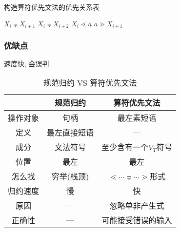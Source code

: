             \begin{algorithm}
                \caption{构造算符优先文法的优先关系表}
                \label{algorithm-make-priority-table}
                \begin{algorithmic}[1]
                                    \State $X_i\eqdot X_{i+1}$
                                    \State $X_i\eqdot X_{i+2}$
                                        \State $X_i\lessdot a$
                                    \EndFor
                                        \State $a\gtrdot X_{i+1}$
                                    \EndFor
                                \EndIf
                            \EndFor
                        \EndFor
                    \EndProcedure
                \end{algorithmic}
            \end{algorithm}

            \subsubsection{优缺点}

                速度快, 会误判

                \begin{table}[h!]
                    \centering
                    \caption{规范归约 VS 算符优先文法}
                    \label{tab:gfgyvcsfyx}
                    \begin{tabular}{ccc}\toprule
                        & 规范归约 & 算符优先文法 \\ \midrule
                        操作对象 & 句柄 & 最左素短语 \\
                        定义 & 最左直接短语 & --- \\
                        成分 & 文法符号 & 至少含有一个$V_T$符号 \\
                        位置 & 最左 & 最左 \\
                        怎么找 & 穷举(栈顶) & $\lessdot\cdots\eqdot\cdots\gtrdot$形式 \\
                        归约速度 & 慢 & 快 \\
                        原因 & --- & 忽略单非产生式 \\
                        正确性 & --- & 可能接受错误的输入 \\
                        \bottomrule
                    \end{tabular}
                \end{table}


